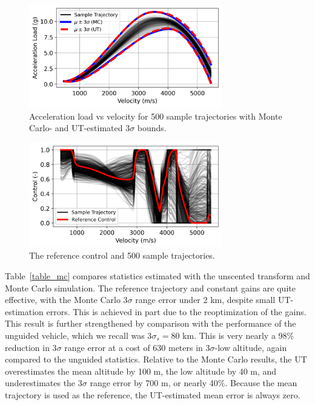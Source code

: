 \documentclass[journal ]{new-aiaa}
\begin{document}
\begin{figure}[h!]
	\centering
	\includegraphics[width=0.75\textwidth]{ddp/python/Acceleration}
	\caption{Acceleration load vs velocity for 500 sample trajectories with Monte Carlo- and UT-estimated 3$\sigma$ bounds.}
	\label{fig_mc_accel}
\end{figure}
\begin{figure}[h!]
	\centering
	\includegraphics[width=0.75\textwidth]{ddp/python/Control}
	\caption{The reference control and 500 sample trajectories.}
	\label{fig_mc_control}
\end{figure}

Table~\ref{table_mc} compares statistics estimated with the unscented transform and Monte Carlo simulation. The reference trajectory and constant gains are quite effective, with the Monte Carlo 3$ \sigma $ range error under 2 km, despite small UT-estimation errors. This is achieved in part due to the reoptimization of the gains. This result is further strengthened by comparison with the performance of the unguided vehicle, which we recall was 3$\sigma_s = 80$ km. This is very nearly a 98\% reduction in 3$\sigma$ range error at a cost of 630 meters in 3$\sigma$-low altitude, again compared to the unguided statistics.
Relative to the Monte Carlo results, the UT overestimates the mean altitude by 100 m, the low altitude by 40 m, and underestimates the 3$ \sigma $ range error by 700 m, or nearly 40\%. Because the mean trajectory is used as the reference, the UT-estimated mean error is always zero.
\end{document}
